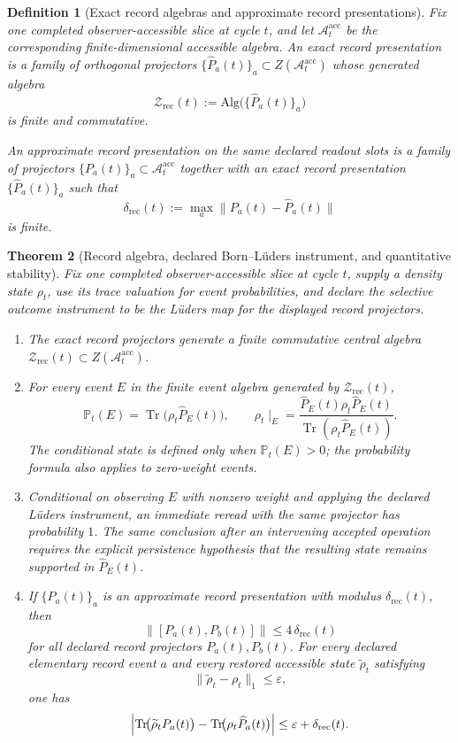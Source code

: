 \documentclass[11pt]{article}
\newtheorem{theorem}{Theorem}[section]
\newtheorem{definition}[theorem]{Definition}
\theoremstyle{remark}
\theoremstyle{plain}
\begin{document}
\begin{definition}[Exact record algebras and approximate record presentations]\label{def:lattice}
Fix one completed observer-accessible slice at cycle \(t\), and let
\(\mathcal A_t^{\mathrm{acc}}\) be the corresponding finite-dimensional accessible algebra. An
\emph{exact record presentation} is a family of orthogonal projectors
\(\{\widehat P_a(t)\}_a\subset Z(\mathcal A_t^{\mathrm{acc}})\) whose generated algebra
\[
\mathcal Z_{\mathrm{rec}}(t)
:=
\mathrm{Alg}\bigl(\{\widehat P_a(t)\}_a\bigr)
\]
is finite and commutative.

An \emph{approximate record presentation} on the same declared readout slots is a family of
projectors \(\{P_a(t)\}_a\subset \mathcal A_t^{\mathrm{acc}}\) together with an exact record
presentation \(\{\widehat P_a(t)\}_a\) such that
\[
\delta_{\mathrm{rec}}(t)
:=
\max_a \|P_a(t)-\widehat P_a(t)\|
\]
is finite.
\end{definition}

\begin{theorem}[Record algebra, declared Born--L\"uders instrument, and quantitative stability]\label{thm:crdt}
Fix one completed observer-accessible slice at cycle \(t\), supply a density
state \(\rho_t\), use its trace valuation for event probabilities, and declare
the selective outcome instrument to be the L\"uders map for the displayed
record projectors.
\begin{enumerate}
\item The exact record projectors generate a finite commutative central algebra
\(\mathcal Z_{\mathrm{rec}}(t)\subset Z(\mathcal A_t^{\mathrm{acc}})\).
\item For every event \(E\) in the finite event algebra generated by \(\mathcal Z_{\mathrm{rec}}(t)\),
\[
\mathbb P_t(E)=\operatorname{Tr}\!\bigl(\rho_t \widehat P_E(t)\bigr),
\qquad
\rho_t\!\mid_E
=
\frac{\widehat P_E(t)\rho_t \widehat P_E(t)}
{\operatorname{Tr}(\rho_t \widehat P_E(t))}.
\]
The conditional state is defined only when \(\mathbb P_t(E)>0\); the
probability formula also applies to zero-weight events.
\item Conditional on observing \(E\) with nonzero weight and applying the
declared L\"uders instrument, an immediate reread with the same projector has
probability \(1\). The same conclusion after an intervening accepted operation
requires the explicit persistence hypothesis that the resulting state remains
supported in \(\widehat P_E(t)\).
\item If \(\{P_a(t)\}_a\) is an approximate record presentation with modulus
\(\delta_{\mathrm{rec}}(t)\), then
\[
\|[P_a(t),P_b(t)]\|\le 4\,\delta_{\mathrm{rec}}(t)
\]
for all declared record projectors \(P_a(t),P_b(t)\). For every declared elementary
record event \(a\) and every restored accessible state \(\widetilde\rho_t\) satisfying
\[
\|\widetilde\rho_t-\rho_t\|_1\le \varepsilon,
\]
one has
\[
\Bigl|
\operatorname{Tr}\!\bigl(\widetilde\rho_t P_a(t)\bigr)
-
\operatorname{Tr}\!\bigl(\rho_t \widehat P_a(t)\bigr)
\Bigr|
\le
\varepsilon+\delta_{\mathrm{rec}}(t).
\]
\end{enumerate}
\end{theorem}
\end{document}
